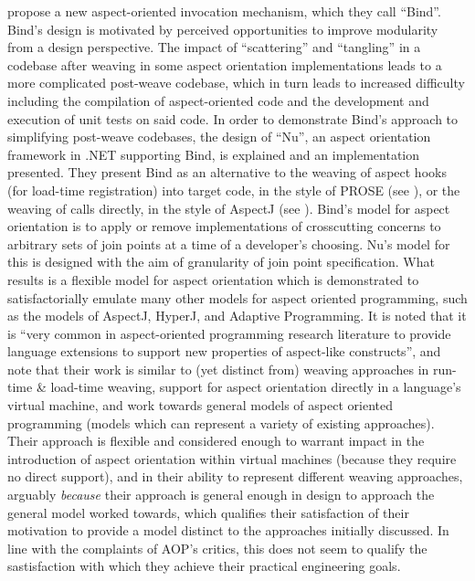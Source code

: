 




\citeauthor{rajan2006nu_towardsao_invocation} propose a new aspect-oriented
invocation mechanism, which they call
``Bind''\cite{rajan2006nu_towardsao_invocation}. Bind's design is motivated by
perceived opportunities to improve modularity from a design perspective. The
impact of ``scattering'' and ``tangling'' in a codebase after weaving in some
aspect orientation implementations leads to a more complicated post-weave
codebase, which in turn leads to increased difficulty including the compilation
of aspect-oriented code and the development and execution of unit tests on said
code. In order to demonstrate Bind's approach to simplifying post-weave
codebases, the design of ``Nu'', an aspect orientation framework in .NET
supporting Bind, is explained and an implementation presented. They present Bind
as an alternative to the weaving of aspect hooks (for load-time registration)
into target code, in the style of PROSE (see
\cite{popovici2002PROSE,popovici2003JITaspects}), or the weaving of calls
directly, in the style of AspectJ (see \cite{aspectj_intro}). Bind's model for
aspect orientation is to apply or remove implementations of crosscutting
concerns to arbitrary sets of join points at a time of a developer's choosing.
Nu's model for this is designed with the aim of granularity of join point
specification. What results is a flexible model for aspect orientation which is
demonstrated to satisfactorially emulate many other models for aspect oriented
programming, such as the models of AspectJ, HyperJ, and Adaptive Programming. It
is noted that it is ``very common in aspect-oriented programming research
literature to provide language extensions to support new properties of
aspect-like constructs'', and note that their work is similar to (yet distinct
from) weaving approaches in run-time \& load-time weaving, support for aspect
orientation directly in a language's virtual machine, and work towards general
models of aspect oriented programming (models which can represent a variety of
existing approaches). Their approach is flexible and considered enough to
warrant impact in the introduction of aspect orientation within virtual machines
(because they require no direct support), and in their ability to represent
different weaving approaches, arguably \emph{because} their approach is general
enough in design to approach the general model worked towards, which qualifies
their satisfaction of their motivation to provide a model distinct to the
approaches initially discussed. In line with the complaints of AOP's critics,
this does not seem to qualify the sastisfaction with which they achieve their
practical engineering goals.

